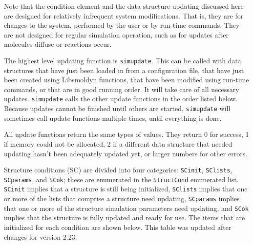 \documentclass {scrbook}
\newcommand {\ttt} {\texttt}
\begin{document}
Note that the condition element and the data structure updating discussed here are designed for relatively infrequent system modifications. That is, they are for changes to the system, performed by the user or by run-time commands. They are not designed for regular simulation operation, such as for updates after molecules diffuse or reactions occur.

The highest level updating function is \ttt{simupdate}. This can be called with data structures that have just been loaded in from a configuration file, that have just been created using Libsmoldyn functions, that have been modified using run-time commands, or that are in good running order. It will take care of all necessary updates. \ttt{simupdate} calls the other update functions in the order listed below. Because updates cannot be finished until others are started, \ttt{simupdate} will sometimes call update functions multiple times, until everything is done.

All update functions return the same types of values. They return 0 for success, 1 if memory could not be allocated, 2 if a different data structure that needed updating hasn't been adequately updated yet, or larger numbers for other errors.

Structure conditions (SC) are divided into four categories: \ttt{SCinit}, \ttt{SClists}, \ttt{SCparams}, and \ttt{SCok}; these are enumerated in the \ttt{StructCond} enumerated list. \ttt{SCinit} implies that a structure is still being initialized, \ttt{SClists} implies that one or more of the lists that comprise a structure need updating, \ttt{SCparams} implies that one or more of the structure simulation parameters need updating, and \ttt{SCok} implies that the structure is fully updated and ready for use. The items that are initialized for each condition are shown below. This table was updated after changes for version 2.23.
\end{document}
